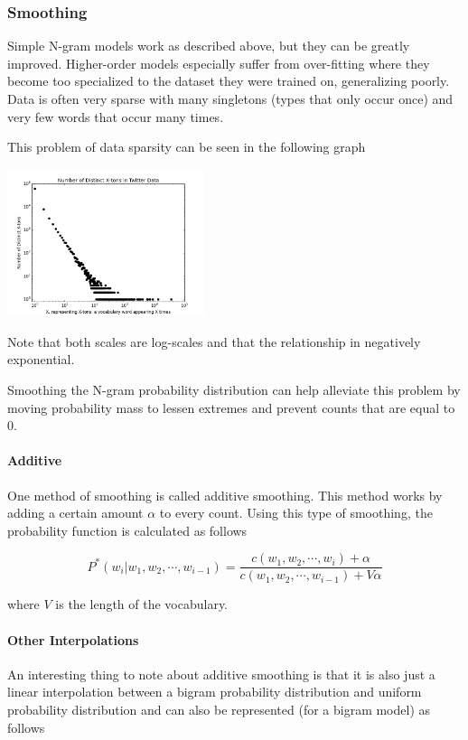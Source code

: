 \documentclass[11pt]{article}
\begin{document}
\subsubsection{Smoothing}

Simple N-gram models work as described above, but they can be greatly improved. Higher-order models especially suffer from over-fitting where they become too specialized to the dataset they were trained on, generalizing poorly. Data is often very sparse with many singletons (types that only occur once) and very few words that occur many times.

This problem of data sparsity can be seen in the following graph

\includegraphics[width=218px]{graphs/x-ton.png}

Note that both scales are log-scales and that the relationship in negatively exponential.

Smoothing the N-gram probability distribution can help alleviate this problem by moving probability mass to lessen extremes and prevent counts that are equal to 0.

\paragraph{Additive}

One method of smoothing is called additive smoothing. This method works by adding a certain amount $\alpha$ to every count. Using this type of smoothing, the probability function is calculated as follows

$$ P^*\left(w_i \vert w_1, w_2, \cdots, w_{i-1} \right) = \frac{ c\left( w_1, w_2, \cdots, w_i \right) + \alpha}{ c\left( w_1, w_2, \cdots, w_{i-1} \right) + V\alpha } $$

where $V$ is the length of the vocabulary.

\paragraph{Other Interpolations}

An interesting thing to note about additive smoothing is that it is also just a linear interpolation between a bigram probability distribution and uniform probability distribution and can also be represented (for a bigram model) as follows
\end{document}

